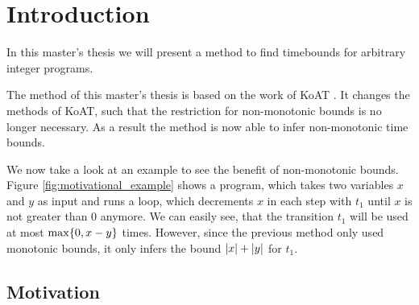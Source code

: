 \section{Introduction}

In this master's thesis we will present a method to find timebounds for arbitrary integer programs.

The method of this master's thesis is based on the work of KoAT \cite{koat}.
It changes the methods of KoAT, such that the restriction for non-monotonic bounds is no longer necessary.
As a result the method is now able to infer non-monotonic time bounds.

We now take a look at an example to see the benefit of non-monotonic bounds.
Figure \ref{fig:motivational_example} shows a program, which takes two variables $x$ and $y$ as input and runs a loop, which decrements $x$ in each step with $t_1$ until $x$ is not greater than 0 anymore.
We can easily see, that the transition $t_1$ will be used at most $\max \lbrace 0, x-y \rbrace$ times.
However, since the previous method only used monotonic bounds, it only infers the bound $\left|x\right|+\left|y\right|$ for $t_1$.


\subsection{Motivation}





